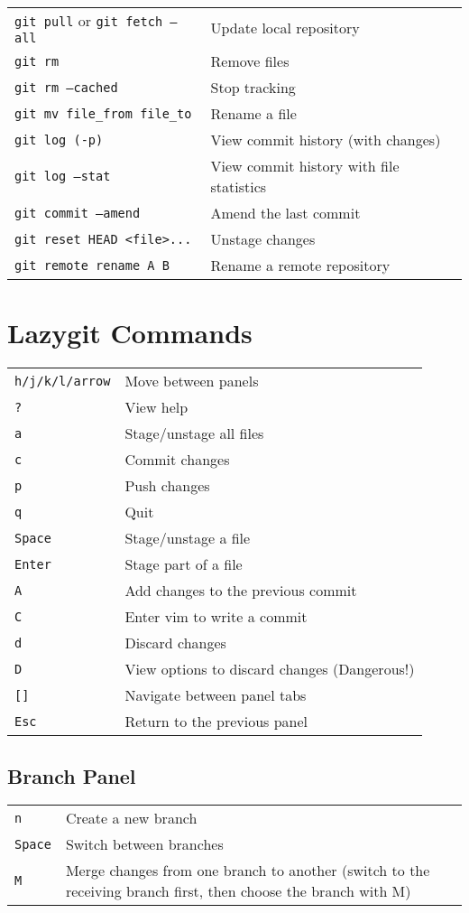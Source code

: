 \documentclass[a4paper]{article}
\renewcommand{\tt}{\texttt}
\begin{document}
\begin{tabular}{p{7.5cm} p{8cm}}
    \tt{git pull} or \tt{git fetch --all}   & Update local repository \\
    \tt{git rm}   & Remove files \\
    \tt{git rm --cached}   & Stop tracking \\
    \tt{git mv file\_from file\_to}   & Rename a file \\
    \tt{git log (-p)}   & View commit history (with changes) \\
    \tt{git log --stat}   & View commit history with file statistics \\
    \tt{git commit --amend}   & Amend the last commit \\
    \tt{git reset HEAD <file>...}   & Unstage changes \\
    \tt{git remote rename A B}   & Rename a remote repository \\

\end{tabular}

\section{Lazygit Commands}
\begin{tabular}{p{6cm} p{8cm}}
    \tt{h/j/k/l/arrow}    & Move between panels \\
    \tt{?}        & View help \\
    \tt{a}          & Stage/unstage all files \\
    \tt{c} & Commit changes \\
    \tt{p}        & Push changes \\ 
    \tt{q}          & Quit \\
    \tt{Space}      & Stage/unstage a file \\
    \tt{Enter}      & Stage part of a file \\
    \tt{A}          & Add changes to the previous commit \\
    \tt{C}          & Enter vim to write a commit \\
    \tt{d}          & Discard changes \\
    \tt{D}          & View options to discard changes (Dangerous!) \\
    \tt{[]} & Navigate between panel tabs \\
    \tt{Esc}        & Return to the previous panel \\
\end{tabular}

\subsection{Branch Panel}
\begin{tabular}{p{6cm} p{8cm}}
    \tt{n} & Create a new branch \\
    \tt{Space} & Switch between branches \\
    \tt{M} & Merge changes from one branch to another (switch to the receiving branch first, then choose the branch with M) \\
\end{tabular}
\end{document}
